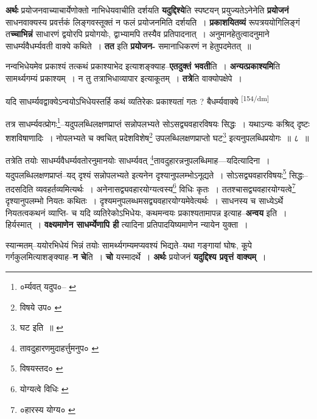 \documentclass[article,12pt,a4paper]{memoir}
\begin{document}
	  \pstart \textbf{अर्थः} प्रयोजनवाच्याचार्येणोक्तो नाभिधेयवाचीति दर्शयति \textbf{यदुद्दिश्ये}ति स्पष्टयन् प्रयुज्यतेऽनेनेति \textbf{प्रयोजनं} साधनवाक्यस्य प्रवर्त्तकं लिङ्गवस्तूक्तं न फलं प्रयोजनमिति दर्शयति । \textbf{प्रकाशयितव्यं} रूपत्रययोगिलिङ्गं त\textbf{च्चाभिन्नं} साधारणं द्वयोरपि प्रयोगयोः, द्वाभ्यामपि तस्यैव प्रतिपादनात् । अनुमानहेतुत्वादनुमाने साधर्म्यवैधर्म्यवती वाक्ये कथिते । \textbf{तत} इति \textbf{प्रयोजन-} समानाधिकरणं न हेतुपदमेतत् ॥
	\pend
      

	  \pstart नन्वभिधेयमेव प्रकाश्यं तत्कथं प्रकाश्याभेद इत्याशङ्क्याह--\textbf{एतदुक्तं भवती}ति । \textbf{अन्यत्प्रकाश्यमि}ति सामर्थ्यगम्यं प्रकाश्यम् । न तु तत्राभिधाव्यापार इत्याकूतम् । \textbf{तत्रे}ति वाक्योपक्षेपे ।
	\pend
      

	  \pstart यदि साधर्म्यवद्वाक्येऽन्वयोऽभिधेयस्तर्हि कथं व्यतिरेकः प्रकाश्यतां गतः ? बैधर्म्यवाक्ये  \leavevmode\textsuperscript{\rmlatinfont\tiny [154/dm]} 
	  
	तत्र साधर्म्यवत्प्रोगः\footnote{०र्म्यवत् यदुप०--\cite{dp-msD} \cite{dp-msB} \cite{dp-edP} \cite{dp-edH} \cite{dp-edE} \cite{dp-edN}}--यदुपलब्धिलक्षणप्राप्तं सन्नोपलभ्यते सोऽसद्व्यवहारविषयः सिद्धः । यथाऽन्यः कश्रिद् दृष्टः शशविषाणादिः । नोपलभ्यते च क्वचित् प्रदेशविशेष\footnote{विषये उप० \cite{dp-msC}} उपलब्धिलक्षणप्राप्तो घट\footnote{घट इति ॥ \cite{dp-msD} \cite{dp-msB} \cite{dp-edP} \cite{dp-edH} \cite{dp-edE} \cite{dp-edN}} इत्यनुपलब्धिप्रयोगः ॥ ८ ॥ 
	  
	तत्रेति तयोः साधर्म्यवैधर्म्यवतोरनुमानयोः साधर्म्यवत् \footnote{तावदुहारणमुदाहर्त्तुमनुप० \cite{dp-msC} \cite{dp-msB}}तावदुहारन्ननुपलब्धिमाह—यदित्यादिना । यदुपलब्धिलक्षणप्राप्तं--यद् दृश्यं सन्नोपलभ्यते इत्यनेन दृश्यानुपलम्भोऽनूद्यते । सोऽसद्व्यवहारविषयः\footnote{विषयस्तद० \cite{dp-msB} \cite{dp-msC} \cite{dp-msD}} सिद्धः--तदसदिति व्यवहर्तव्यमित्यर्थः । अनेनासद्व्यवहारयोग्यत्वस्य\footnote{योग्यत्वे विधिः \cite{dp-msB}} विधिः कृतः । ततश्चासद्व्यवहारयोग्यत्वे\footnote{०हारस्य योग्य० \cite{dp-msA} \cite{dp-msB} \cite{dp-edP} \cite{dp-edH} \cite{dp-edE} \cite{dp-edN}} दृश्यानुपलम्भो नियतः कथितः । दृश्यमनुपलब्धमसद्व्यवहारयोग्यमेवेत्यर्थः । साधनस्य च साध्येऽर्थे नियतत्वकथनं व्याप्ति- च यदि व्यतिरेकोऽभिधेयः, कथमन्वयः प्रकाश्यतामापन्न इत्याह--\textbf{अन्वय} इति । हिर्यस्मात् । \textbf{वक्ष्यमाणेन साधर्म्येणापि ही} त्यादिना प्रतिपादयिष्यमाणेन न्यायेन युक्ता ।
	\pend
      

	  \pstart स्यान्मतम्--ययोरभिधेयं भिन्नं तयोः सामर्थ्यगम्यमप्यवश्यं भिद्यते--यथा गङ्गायां घोषः, कूपे गर्गकुलमित्याशङ्क्याह--\textbf{न चे}ति । \textbf{चो} यस्मादर्थे । \textbf{अर्थः} प्रयोजनं \textbf{यदुद्दिश्य प्रवृत्तं वाक्यम्} ।
	\pend
      
\end{document}
